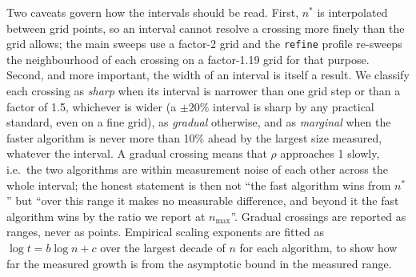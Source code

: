 Two caveats govern how the intervals should be read. First, $n^*$ is
interpolated between grid points, so an interval cannot resolve a crossing
more finely than the grid allows; the main sweeps use a factor-2 grid and the
\texttt{refine} profile re-sweeps the neighbourhood of each crossing on a
factor-1.19 grid for that purpose. Second, and more important, the width of an
interval is itself a result. We classify each crossing as \emph{sharp} when
its interval is narrower than one grid step or than a factor of 1.5,
whichever is wider (a $\pm20\%$ interval is sharp by any practical standard,
even on a fine grid), as \emph{gradual} otherwise, and as \emph{marginal}
when the faster algorithm is never more than 10\% ahead by the largest size
measured, whatever the interval. A gradual crossing means that $\rho$ approaches
1 slowly, i.e.\ the two algorithms are within measurement noise of each other
across the whole interval; the honest statement is then not ``the fast
algorithm wins from $n^*$'' but ``over this range it makes no measurable
difference, and beyond it the fast algorithm wins by the ratio we report at
$n_{\max}$''. Gradual crossings are reported as ranges, never as points. Empirical scaling exponents are fitted as $\log t = b\log n + c$
over the largest decade of $n$ for each algorithm, to show how far the
measured growth is from the asymptotic bound in the measured range.
